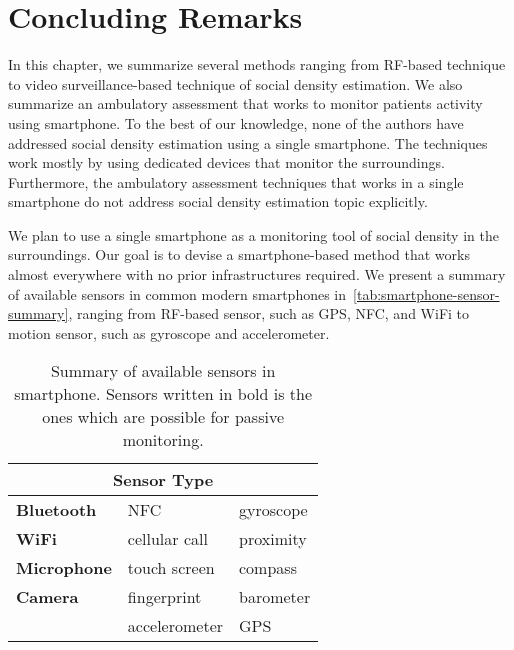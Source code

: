  






\section{Concluding Remarks} %
\label{sec:literature_concluding_remarks}
In this chapter, we summarize several methods ranging from \ac{RF}-based technique to video surveillance-based technique of social density estimation. We also summarize an ambulatory assessment that works to monitor patients activity using smartphone. To the best of our knowledge, none of the authors have addressed social density estimation using a single smartphone. The techniques work mostly by using dedicated devices that monitor the surroundings. Furthermore, the ambulatory assessment techniques that works in a single smartphone do not address social density estimation topic explicitly.

We plan to use a single smartphone as a monitoring tool of social density in the surroundings. Our goal is to devise a smartphone-based method that works almost everywhere with no prior infrastructures required. We present a summary of available sensors in common modern smartphones in~\autoref{tab:smartphone-sensor-summary}, ranging from \ac{RF}-based sensor, such as \ac{GPS}, \ac{NFC}, and WiFi to motion sensor, such as gyroscope and accelerometer.

\begin{table}[]
\centering
\caption{Summary of available sensors in smartphone. Sensors written in bold is the ones which are possible for passive monitoring.}
\label{tab:smartphone-sensor-summary}
\begin{tabular}{lll}
\toprule
\multicolumn{3}{c}{Sensor Type} \\ \midrule
\textbf{Bluetooth}   & \ac{NFC}                    & gyroscope \\
\textbf{WiFi}        & cellular call               & proximity \\
\textbf{Microphone}  & touch screen                & compass \\
\textbf{Camera}      & fingerprint                 & barometer \\
                     & accelerometer               & \ac{GPS} \\
\bottomrule
\end{tabular}
\end{table}

